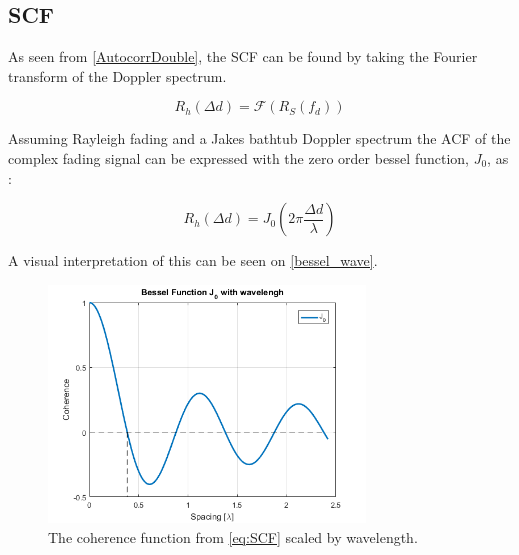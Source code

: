 



\subsection{\Gls{SCF}}
\label{SCFchap}
As seen from \autoref{AutocorrDouble}, the SCF can be found by taking the Fourier transform of the Doppler spectrum. 

\begin{equation}
R_{h}(\Delta d) = \mathcal{F}(R_{S}(f_d))
\end{equation}

Assuming Rayleigh fading and a Jakes bathtub Doppler spectrum the ACF of the complex fading signal can be expressed with the zero order bessel function, $J_0$, as \citep[p.329]{Jakes_microwave}:

\begin{equation}\label{eq:SCF}
R_h(\Delta d) = J_0\left(2\pi \frac{\Delta d}{\lambda}\right)
\end{equation}

A visual interpretation of this can be seen on \autoref{bessel_wave}.

\begin{figure}[H]
\centering
\includegraphics[width=0.75\textwidth]{figures/Bessel_wavlength.png}
\caption{The coherence function from \autoref{eq:SCF} scaled by wavelength.}
\label{bessel_wave}
\end{figure}

